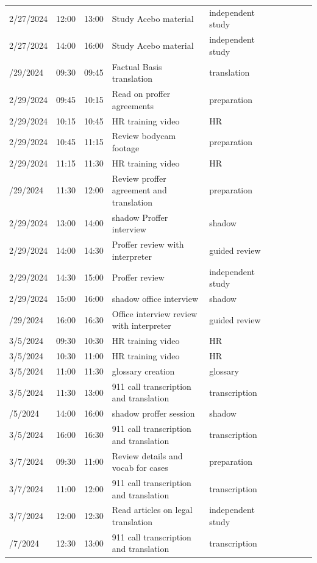 \documentclass{article}
\begin{document}
\begin{longtable}{lp{1.8cm} l p{5cm} l p{1.5cm} l p{5cm} l p{5cm}}
2/27/2024 & 12:00 & 13:00 & Study Acebo material & independent study\\
2/27/2024 & 14:00 & 16:00 & Study Acebo material & independent study\\
\addlinespace
2/29/2024 & 09:30 & 09:45 & Factual Basis translation & translation\\
2/29/2024 & 09:45 & 10:15 & Read on proffer agreements & preparation\\
2/29/2024 & 10:15 & 10:45 & HR training video & HR\\
2/29/2024 & 10:45 & 11:15 & Review bodycam footage & preparation\\
2/29/2024 & 11:15 & 11:30 & HR training video & HR\\
\addlinespace
2/29/2024 & 11:30 & 12:00 & Review proffer agreement and translation & preparation\\
2/29/2024 & 13:00 & 14:00 & shadow Proffer interview & shadow\\
2/29/2024 & 14:00 & 14:30 & Proffer review with interpreter & guided review\\
2/29/2024 & 14:30 & 15:00 & Proffer review & independent study\\
2/29/2024 & 15:00 & 16:00 & shadow office interview & shadow\\
\addlinespace
2/29/2024 & 16:00 & 16:30 & Office interview review with interpreter & guided review\\
3/5/2024 & 09:30 & 10:30 & HR training video & HR\\
3/5/2024 & 10:30 & 11:00 & HR training video & HR\\
3/5/2024 & 11:00 & 11:30 & glossary creation & glossary\\
3/5/2024 & 11:30 & 13:00 & 911 call transcription and translation & transcription\\
\addlinespace
3/5/2024 & 14:00 & 16:00 & shadow proffer session & shadow\\
3/5/2024 & 16:00 & 16:30 & 911 call transcription and translation & transcription\\
3/7/2024 & 09:30 & 11:00 & Review details and vocab for cases & preparation\\
3/7/2024 & 11:00 & 12:00 & 911 call transcription and translation & transcription\\
3/7/2024 & 12:00 & 12:30 & Read articles on legal translation & independent study\\
\addlinespace
3/7/2024 & 12:30 & 13:00 & 911 call transcription and translation & transcription\\

\end{longtable}
\end{document}
